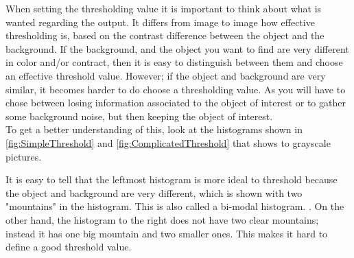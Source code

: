 When setting the thresholding value it is important to think about what is wanted regarding the output. It differs  from image to image how effective thresholding is, based on the contrast difference between the object and the background. If the background, and the object you want to find are very different in color and/or contract, then it is easy to distinguish between them and choose an effective threshold value. However; if the object and background are very similar, it becomes harder to do choose a thresholding value. As you will have to chose between losing information associated to the object of interest or to gather some background noise, but then keeping the object of interest.\\
To get a better understanding of this, look at the histograms shown in \eqref{fig:SimpleThreshold} and \eqref{fig:ComplicatedThreshold} that shows to grayscale pictures.

It is easy to tell that the leftmost histogram is more ideal to threshold because the object and background are very different, which is shown with two "mountains" in the histogram. This is also called a bi-modal histogram. \citep{ip_book}. On the other hand, the histogram to the right does not have two clear mountains; instead it has one big mountain and two smaller ones. This makes it hard to define a good threshold value.

